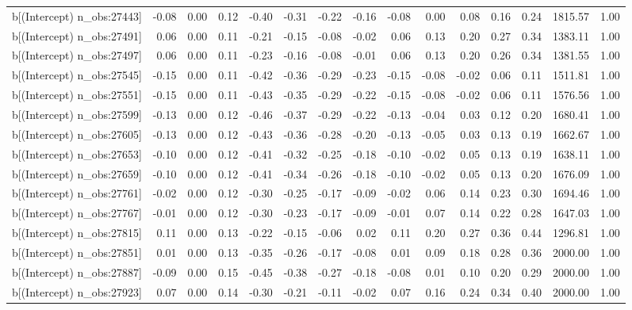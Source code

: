 \begin{table}[ht]
\begin{tabular}{rrrrrrrrrrrrrrr}
  b[(Intercept) n\_obs:27443] & -0.08 & 0.00 & 0.12 & -0.40 & -0.31 & -0.22 & -0.16 & -0.08 & 0.00 & 0.08 & 0.16 & 0.24 & 1815.57 & 1.00 \\ 
  b[(Intercept) n\_obs:27491] & 0.06 & 0.00 & 0.11 & -0.21 & -0.15 & -0.08 & -0.02 & 0.06 & 0.13 & 0.20 & 0.27 & 0.34 & 1383.11 & 1.00 \\ 
  b[(Intercept) n\_obs:27497] & 0.06 & 0.00 & 0.11 & -0.23 & -0.16 & -0.08 & -0.01 & 0.06 & 0.13 & 0.20 & 0.26 & 0.34 & 1381.55 & 1.00 \\ 
  b[(Intercept) n\_obs:27545] & -0.15 & 0.00 & 0.11 & -0.42 & -0.36 & -0.29 & -0.23 & -0.15 & -0.08 & -0.02 & 0.06 & 0.11 & 1511.81 & 1.00 \\ 
  b[(Intercept) n\_obs:27551] & -0.15 & 0.00 & 0.11 & -0.43 & -0.35 & -0.29 & -0.22 & -0.15 & -0.08 & -0.02 & 0.06 & 0.11 & 1576.56 & 1.00 \\ 
  b[(Intercept) n\_obs:27599] & -0.13 & 0.00 & 0.12 & -0.46 & -0.37 & -0.29 & -0.22 & -0.13 & -0.04 & 0.03 & 0.12 & 0.20 & 1680.41 & 1.00 \\ 
  b[(Intercept) n\_obs:27605] & -0.13 & 0.00 & 0.12 & -0.43 & -0.36 & -0.28 & -0.20 & -0.13 & -0.05 & 0.03 & 0.13 & 0.19 & 1662.67 & 1.00 \\ 
  b[(Intercept) n\_obs:27653] & -0.10 & 0.00 & 0.12 & -0.41 & -0.32 & -0.25 & -0.18 & -0.10 & -0.02 & 0.05 & 0.13 & 0.19 & 1638.11 & 1.00 \\ 
  b[(Intercept) n\_obs:27659] & -0.10 & 0.00 & 0.12 & -0.41 & -0.34 & -0.26 & -0.18 & -0.10 & -0.02 & 0.05 & 0.13 & 0.20 & 1676.09 & 1.00 \\ 
  b[(Intercept) n\_obs:27761] & -0.02 & 0.00 & 0.12 & -0.30 & -0.25 & -0.17 & -0.09 & -0.02 & 0.06 & 0.14 & 0.23 & 0.30 & 1694.46 & 1.00 \\ 
  b[(Intercept) n\_obs:27767] & -0.01 & 0.00 & 0.12 & -0.30 & -0.23 & -0.17 & -0.09 & -0.01 & 0.07 & 0.14 & 0.22 & 0.28 & 1647.03 & 1.00 \\ 
  b[(Intercept) n\_obs:27815] & 0.11 & 0.00 & 0.13 & -0.22 & -0.15 & -0.06 & 0.02 & 0.11 & 0.20 & 0.27 & 0.36 & 0.44 & 1296.81 & 1.00 \\ 
  b[(Intercept) n\_obs:27851] & 0.01 & 0.00 & 0.13 & -0.35 & -0.26 & -0.17 & -0.08 & 0.01 & 0.09 & 0.18 & 0.28 & 0.36 & 2000.00 & 1.00 \\ 
  b[(Intercept) n\_obs:27887] & -0.09 & 0.00 & 0.15 & -0.45 & -0.38 & -0.27 & -0.18 & -0.08 & 0.01 & 0.10 & 0.20 & 0.29 & 2000.00 & 1.00 \\ 
  b[(Intercept) n\_obs:27923] & 0.07 & 0.00 & 0.14 & -0.30 & -0.21 & -0.11 & -0.02 & 0.07 & 0.16 & 0.24 & 0.34 & 0.40 & 2000.00 & 1.00 \\ 

\end{tabular}
\end{table}
